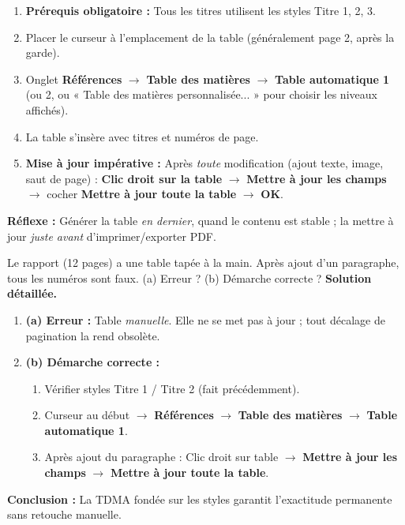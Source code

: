 \documentclass[11pt]{article}
\begin{document}
\begin{methode}
\begin{enumerate}
  \item \textbf{Prérequis obligatoire :} Tous les titres utilisent les styles Titre 1, 2, 3.
  \item Placer le curseur à l'emplacement de la table (généralement page 2, après la garde).
  \item Onglet \textbf{Références} $\rightarrow$ \textbf{Table des matières} $\rightarrow$ \textbf{Table automatique 1} (ou 2, ou « Table des matières personnalisée... » pour choisir les niveaux affichés).
  \item La table s'insère avec titres et numéros de page.
  \item \textbf{Mise à jour impérative :} Après \emph{toute} modification (ajout texte, image, saut de page) : \textbf{Clic droit sur la table} $\rightarrow$ \textbf{Mettre à jour les champs} $\rightarrow$ cocher \textbf{Mettre à jour toute la table} $\rightarrow$ \textbf{OK}.
\end{enumerate}
\textbf{Réflexe :} Générer la table \emph{en dernier}, quand le contenu est stable ; la mettre à jour \emph{juste avant} d'imprimer/exporter PDF.
\end{methode}

\begin{exoresolu}
Le rapport (12 pages) a une table tapée à la main. Après ajout d'un paragraphe, tous les numéros sont faux. (a) Erreur ? (b) Démarche correcte ?
\tcblower
\textbf{Solution détaillée.}
\begin{enumerate}
  \item \textbf{(a) Erreur :} Table \emph{manuelle}. Elle ne se met pas à jour ; tout décalage de pagination la rend obsolète.
  \item \textbf{(b) Démarche correcte :}
  \begin{enumerate}
    \item Vérifier styles Titre 1 / Titre 2 (fait précédemment).
    \item Curseur au début $\rightarrow$ \textbf{Références} $\rightarrow$ \textbf{Table des matières} $\rightarrow$ \textbf{Table automatique 1}.
    \item Après ajout du paragraphe : Clic droit sur table $\rightarrow$ \textbf{Mettre à jour les champs} $\rightarrow$ \textbf{Mettre à jour toute la table}.
  \end{enumerate}
\end{enumerate}
\textbf{Conclusion :} La TDMA fondée sur les styles garantit l'exactitude permanente sans retouche manuelle.
\end{exoresolu}
\end{document}
